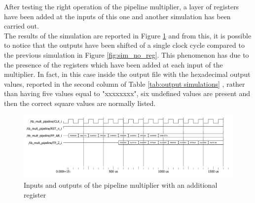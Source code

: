 \documentclass[a4paper, titlepage]{article}
\begin{document}
\noindent
\newline
After testing the right operation of the pipeline multiplier, a layer of registers have been added at the inputs of this one and another simulation has been carried out.\\The results of the simulation are reported in Figure \ref{fig:sim_inreg} and from this, it is possible to notice that the outputs have been shifted of a single clock cycle compared to the previous simulation in Figure \ref{fig:sim_no_reg}. This phenomenon has due to the presence of the registers which have been added at each input of the multiplier. In fact, in this case inside the output file with the hexadecimal output values, reported in the second column of Table \ref{tab:output simulations} , rather than having five values equal to "xxxxxxxx", six undefined values are present and then the correct square values are normally listed.
\begin{figure} [h]
\centering
\includegraphics[scale=0.5]{print_sim_inreg.png}
	\caption{Inputs and outputs of the pipeline multiplier with an additional register}
	\label{fig:sim_inreg}
\end{figure}
\noindent
\end{document}
